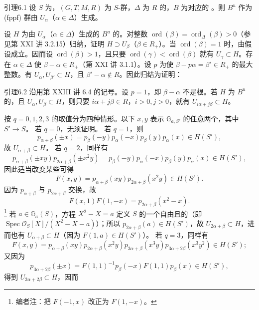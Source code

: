 \begin{SGAresult}{引理}{6.1}
设 $S$ 为，$(G,T,M,R)$ 为 $S$-群，$\Delta$ 为 $R$ 的，$B$ 为对应的 。则 $B^u$ 作为 (fppf) 群由 $U_\alpha$（$\alpha\in\Delta$）生成。
\end{SGAresult}
设 $H$ 为由 $U_\alpha$（$\alpha\in\Delta$）生成的 $B^u$ 的。对整数 $\operatorname{ord}(\beta)=\operatorname{ord}_\Delta(\beta)>0$（参见第 XXI 讲 3.2.15）归纳，证明 $H\supset U_\beta$（$\beta\in R_+$）。当 $\operatorname{ord}(\beta)=1$ 时，由假设成立。因而设 $\operatorname{ord}(\beta)>1$，且只要 $\operatorname{ord}(\gamma)<\operatorname{ord}(\beta)$ 就有 $U_\gamma\subset H$。存在 $\alpha\in\Delta$ 使 $\beta-\alpha\in R_+$（第 XXI 讲 3.1.1）。设 $p$ 为使 $\beta-p\alpha=\beta'\in R_+$ 的最大整数。有 $U_\alpha,U_{\beta'}\subset H$，且 $\beta'-\alpha\notin R$。因此归结为证明：
\begin{SGAresult}{引理}{6.2}
沿用第 XXIII 讲 6.4 的记号。设 $p=1$，即 $\beta-\alpha$ 不是根。若 $H$ 为 $B^u$ 的，且 $U_\alpha,U_\beta\subset H$，则只要 $i\alpha+j\beta\in R$，$i>0,j>0$，就有 $U_{i\alpha+j\beta}\subset H$。
\end{SGAresult}
按 $q=0,1,2,3$ 的取值分为四种情形。以下 $x,y$ 表示 $\mathbb G_{a,S'}$ 的任意两个，其中 $S'\to S$。
若 $q=0$，无须证明。
若 $q=1$，则
\[p_{\alpha+\beta}(\pm x)=p_\beta(-y)p_\alpha(-x)p_\beta(y)p_\alpha(x)\in H(S'),\]
故 $U_{\alpha+\beta}\subset H$。
若 $q=2$，同样有
\[p_{\alpha+\beta}(\pm xy)p_{2\alpha+\beta}(\pm x^2y)=p_\beta(-y)p_\alpha(-x)p_\beta(y)p_\alpha(x)\in H(S'),\]
因此适当改变某些可得
\[F(x,y)=p_{\alpha+\beta}(xy)p_{2\alpha+\beta}(x^2y)\in H(S').\]
因为 $p_{\alpha+\beta}$ 与 $p_{2\alpha+\beta}$ 交换，故
\[F(x,1)F(1,-x)=p_{2\alpha+\beta}(x^2-x).\]
\footnote{编者注：把 $F(-1,x)$ 改正为 $F(1,-x)$。}
若 $a\in\mathbb G_a(S)$，方程 $X^2-X=a$ 定义 $S$ 的一个自由且的（即 $\operatorname{Spec}\mathscr O_S[X]/(X^2-X-a)$）；所以 $p_{2\alpha+\beta}(a)\in H(S')$，故 $U_{2\alpha+\beta}\subset H$，进而也有 $U_{\alpha+\beta}\subset H$（因为 $F(1,a)\in H(S')$）。
若 $q=3$，同样有
\[F(x,y)=p_{\alpha+\beta}(xy)p_{2\alpha+\beta}(x^2y)p_{3\alpha+\beta}(x^3y)p_{3\alpha+2\beta}(x^3y^2)\in H(S');\]
又因为
\[p_{3\alpha+2\beta}(\pm x)=F(1,1)^{-1}p_\beta(-x)F(1,1)p_\beta(x)\in H(S'),\]
得到 $U_{3\alpha+2\beta}\subset H$，因而
